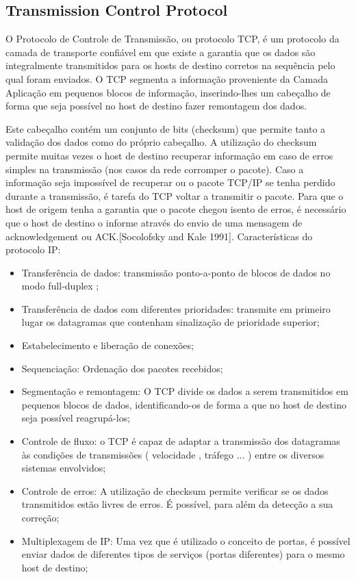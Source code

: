 \documentclass[brazil, a4paper,12pt]{article}
\begin{document}
\subsection{Transmission Control Protocol}

O Protocolo de Controle de Transmissão, ou protocolo TCP, é um protocolo da camada de transporte confiável em que existe a garantia que os dados são integralmente transmitidos para os hosts de destino corretos na sequência pelo qual foram enviados.  O TCP segmenta a informação proveniente da Camada Aplicação em pequenos blocos de informação, inserindo-lhes um cabeçalho de forma que seja possível no host de destino fazer remontagem dos dados.

Este cabeçalho contém um conjunto de bits (checksum) que permite tanto a validação dos dados como do próprio cabeçalho.  A utilização do checksum permite muitas vezes o host de destino recuperar informação em caso de erros simples na transmissão (nos casos da rede corromper o pacote). Caso a informação seja impossível de recuperar ou o pacote TCP/IP se tenha perdido durante a transmissão, é tarefa do TCP voltar a transmitir o pacote. Para que o host de origem tenha a garantia que o pacote chegou isento de erros, é necessário que o host de destino o informe através do envio de uma mensagem de acknowledgement ou ACK.[Socolofsky and Kale 1991]. Características do protocolo IP:

\begin{itemize}
\item Transferência de dados:  transmissão ponto-a-ponto de blocos de dados no modo full-duplex ;
\item Transferência de dados com diferentes prioridades:  transmite em primeiro lugar os datagramas que contenham sinalização de prioridade superior;
\item Estabelecimento e liberação de conexões;
\item Sequenciação: Ordenação dos pacotes recebidos;
\item Segmentação e remontagem:  O TCP divide os dados a serem transmitidos em pequenos blocos de dados, identificando-os de forma a que no host de destino seja possível reagrupá-los;
\item Controle de fluxo:  o TCP é capaz de adaptar a transmissão dos datagramas às condições de transmissões ( velocidade , tráfego ...  )  entre os diversos sistemas envolvidos;
\item Controle de erros:  A utilização de checksum permite verificar se os dados transmitidos estão livres de erros. É possível, para além da detecção a sua correção;
\item Multiplexagem de IP: Uma vez que é utilizado o conceito de portas, é possível enviar dados de diferentes tipos de serviços (portas diferentes) para o mesmo host de destino;
\end{itemize}
\end{document}
